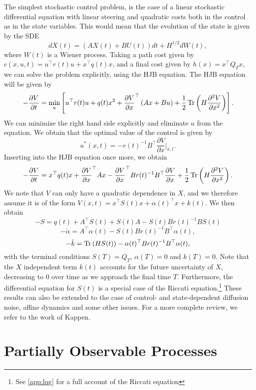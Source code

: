 The simplest stochastic control problem, is the case of a linear stochastic differential equation with linear steering and quadratic costs both in the control as in the state variables. This would mean that the evolution of the state is given by the SDE
\begin{equation}
\label{eq:ctl_diff_dyn}
dX(t) = \left(A X(t) + B U(t)\right) dt + H^{1/2} dW(t),
\end{equation}
where $W(t)$ is a Wiener process. Taking a path cost given by $c(x,u,t) = u^\top r(t) u+ x^\top q(t) x$, and a final cost given by $h(x) = x^\top Q_T x$, we can solve the problem explicitly, using the HJB equation. The HJB equation will be given by
$$
-\frac{\partial V}{\partial t} = \min_{u} \left[ u^\top r(t) u +  q(t) x^2 + \frac{\partial V}{\partial x}^\top \left(A x  + B u\right) + \frac{1}{2} \operatorname{Tr}\left(H\frac{\partial^2 V}{\partial x^2}\right) \right].
$$
We can minimize the right hand side explicitly and eliminate $u$ from the equation. We obtain that the optimal value of the control is given by
$$
u^*(x,t) = - r(t)^{-1} B^\top\frac{\partial V}{\partial x}\big|_{x,t}.
$$
Inserting into the HJB equation once more, we obtain
$$
-\frac{\partial V}{\partial t} = x^\top q(t) x +\frac{\partial V}{\partial x}^\top A x -\frac{\partial V}{\partial x}^\top B r(t)^{-1} B^\top \frac{\partial V}{\partial x} + \frac{1}{2}\operatorname{Tr}\left(H\frac{\partial^2 V}{\partial x^2}\right).
$$
We note that $V$ can only have a quadratic dependence in $X$, and we therefore assume it is of the form $V(x,t) = x^\top S(t) x + \alpha(t)^\top x + k(t)$. We then 
obtain
$$
-\dot{S} = q(t) + A^\top S(t) + S(t) A - S(t) B r(t)^{-1} B S(t)
$$
$$
-\dot{\alpha} = A^\top \alpha(t)-S(t) B r(t)^{-1} B^\top \alpha(t),
$$
$$
-\dot{k} = \operatorname{Tr}\left(H S(t)\right)-\alpha(t)^\top B r(t)^{-1} B^\top \alpha(t),
$$
with the terminal conditions $S(T) = Q_T$, $\alpha(T) = 0$ and $k(T)=0$. Note that the $X$ independent term $k(t)$ accounts for the future uncertainty of $X$, decreasing to $0$ over time as we approach the final time $T$. Furthermore, the differential equation for $S(t)$ is a special case of the Riccati equation.\footnote{See \ref{app:lqg} for a full account of the Riccati equation} These results can also be extended to the case of control- and state-dependent diffusion noise, affine dynamics and some other issues. For a more complete review, we refer to the work of Kappen\cite{Kappen2011}.

\section{Partially Observable Processes}

